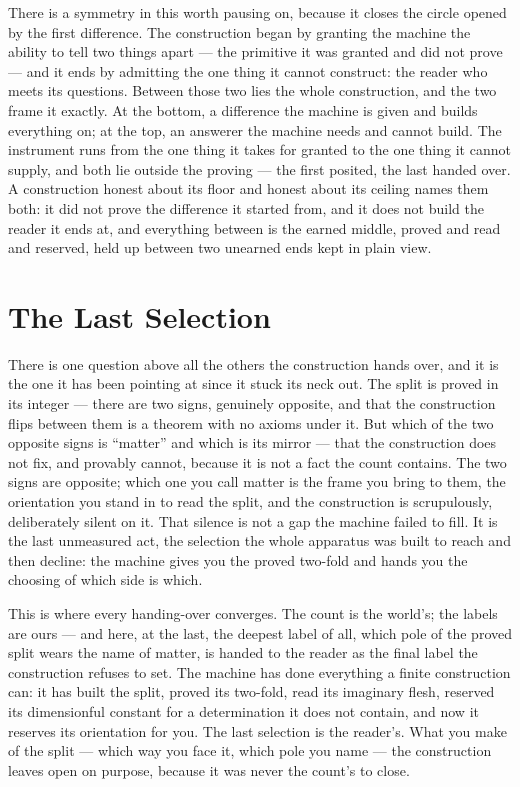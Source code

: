 There is a symmetry in this worth pausing on, because it closes the circle opened by the first difference. The
construction began by granting the machine the ability to tell two things apart --- the primitive it was granted
and did not prove --- and it ends by admitting the one thing it cannot construct: the reader who meets its
questions. Between those two
lies the whole construction, and the two frame it exactly. At the bottom, a difference the machine is given and
builds everything on; at the top, an answerer the machine needs and cannot build. The instrument runs from the
one thing it takes for granted to the one thing it cannot supply, and both lie outside the proving --- the first
posited, the last handed over. A construction honest about its floor and honest about its ceiling names them both:
it did not prove the difference it started from, and it does not build the reader it ends at, and everything
between is the earned middle, proved and read and reserved, held up between two unearned ends kept in plain view.

\section{The Last Selection}

There is one question above all the others the construction hands over, and it is the one it has been pointing at
since it stuck its neck out. The split is proved in its integer --- there are two signs, genuinely opposite, and
that the construction flips between them is a theorem with no axioms under it. But which of the two opposite signs
is ``matter'' and which is its mirror --- that the construction does not fix, and provably cannot, because it is
not a fact the count contains. The two signs are opposite; which one you call matter is the frame you bring to
them, the orientation you stand in to read the split, and the construction is scrupulously, deliberately silent on
it. That silence is not a gap the machine failed to fill. It is the last unmeasured act, the selection the whole
apparatus was built to reach and then decline: the machine gives you the proved two-fold and hands you the
choosing of which side is which.

This is where every handing-over converges. The count is the world's; the labels are ours --- and
here, at the last, the deepest label of all, which pole of the proved split wears the name of matter, is handed
to the reader as the final label the construction refuses to set. The machine has done everything a finite
construction can: it has built the split, proved its two-fold, read its imaginary flesh, reserved its dimensionful
constant for a determination it does not contain, and now it reserves its orientation for you. The last selection
is the reader's. What you make of the split --- which way you face it, which pole you name --- the construction
leaves open on purpose, because it was never the count's to close.

